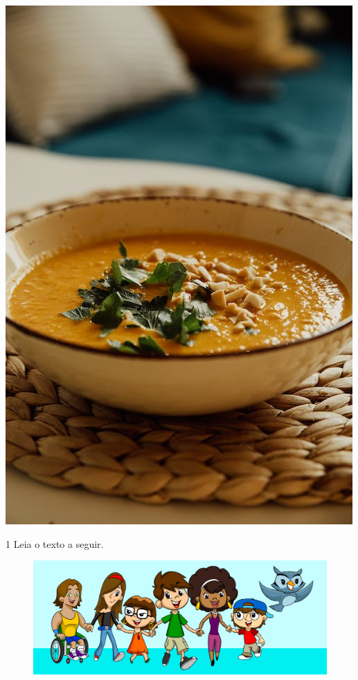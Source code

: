 {\includegraphics[width=\textwidth]{media/image27.jpeg}
}


\num{1} Leia o texto a seguir.


\begin{figure}[htpb!]
\includegraphics[width=\textwidth]{media/image28.jpeg}
\end{figure}

